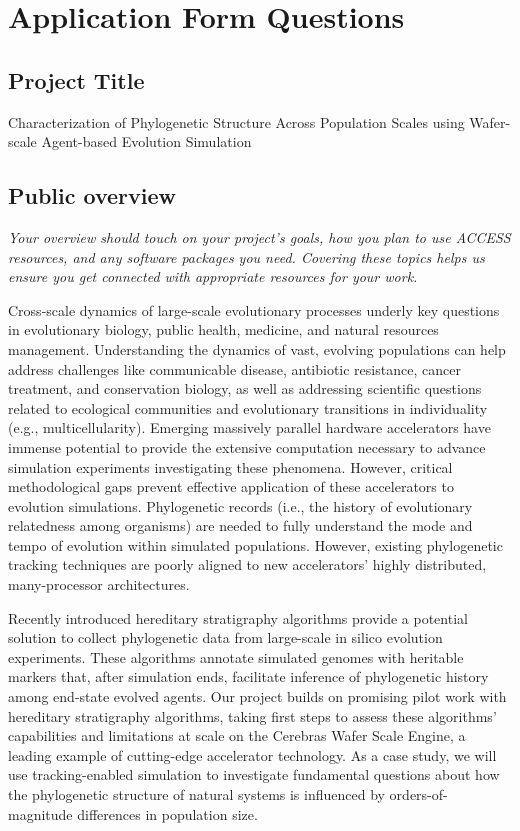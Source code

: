 \section{Application Form Questions}

\subsection{Project Title}

Characterization of Phylogenetic Structure Across Population Scales using Wafer-scale Agent-based Evolution Simulation

\subsection{Public overview}

\begin{displayquote} \itshape
Your overview should touch on your project's goals, how you plan to use ACCESS resources, and any software packages you need.
Covering these topics helps us ensure you get connected with appropriate resources for your work.
\end{displayquote}

Cross-scale dynamics of large-scale evolutionary processes underly key questions in evolutionary biology, public health, medicine, and natural resources management.
Understanding the dynamics of vast, evolving populations can help address challenges like communicable disease, antibiotic resistance, cancer treatment, and conservation biology, as well as addressing scientific questions related to ecological communities and evolutionary transitions in individuality (e.g., multicellularity).
Emerging massively parallel hardware accelerators have immense potential to provide the extensive computation necessary to advance simulation experiments investigating these phenomena.
However, critical methodological gaps prevent effective application of these accelerators to evolution simulations.
Phylogenetic records (i.e., the history of evolutionary relatedness among organisms) are needed to fully understand the mode and tempo of evolution within simulated populations.
However, existing phylogenetic tracking techniques are poorly aligned to new accelerators' highly distributed, many-processor architectures.

Recently introduced hereditary stratigraphy algorithms provide a potential solution to collect phylogenetic data from large-scale in silico evolution experiments.
These algorithms annotate simulated genomes with heritable markers that, after simulation ends, facilitate inference of phylogenetic history among end-state evolved agents.
Our project builds on promising pilot work with hereditary stratigraphy algorithms, taking first steps to assess these algorithms' capabilities and limitations at scale on the Cerebras Wafer Scale Engine, a leading example of cutting-edge accelerator technology.
As a case study, we will use tracking-enabled simulation to investigate fundamental questions about how the phylogenetic structure of natural systems is influenced by orders-of-magnitude differences in population size.


